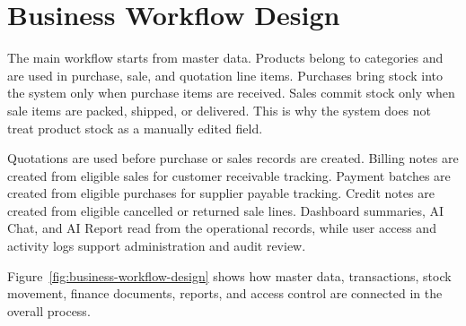\section{Business Workflow Design}
The main workflow starts from master data. Products belong to categories and are used in purchase, sale, and quotation line items. Purchases bring stock into the system only when purchase items are received. Sales commit stock only when sale items are packed, shipped, or delivered. This is why the system does not treat product stock as a manually edited field.

Quotations are used before purchase or sales records are created. Billing notes are created from eligible sales for customer receivable tracking. Payment batches are created from eligible purchases for supplier payable tracking. Credit notes are created from eligible cancelled or returned sale lines. Dashboard summaries, AI Chat, and AI Report read from the operational records, while user access and activity logs support administration and audit review.

Figure~\ref{fig:business-workflow-design} shows how master data, transactions, stock movement, finance documents, reports, and access control are connected in the overall process.

\vspace{0.6\baselineskip}

